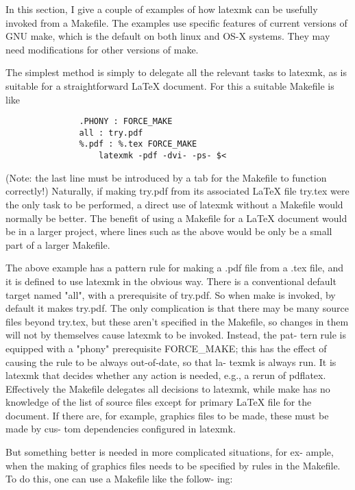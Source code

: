 In this section, I give a couple of examples of how latexmk can be usefully
invoked from a Makefile.  The examples use specific  features  of current
versions  of  GNU make, which is the default on both linux and OS-X systems.
They may need modifications for other versions of make.

The simplest method is simply to delegate all the relevant tasks to latexmk, as
is suitable for a straightforward LaTeX document.  For this a suitable Makefile
is like

\begin{verbatim}
	           .PHONY : FORCE_MAKE
	           all : try.pdf
	           %.pdf : %.tex FORCE_MAKE
	               latexmk -pdf -dvi- -ps- $<
\end{verbatim}

(Note: the last line must be introduced by a tab for  the  Makefile  to
function  correctly!)  Naturally, if making try.pdf from its associated
LaTeX file try.tex were the only task to be performed, a direct use  of
latexmk  without  a  Makefile would normally be better.  The benefit of
using a Makefile for a LaTeX document would be  in  a  larger  project,
where lines such as the above would be only be a small part of a larger
Makefile.

The above example has a pattern rule for making a .pdf file from a .tex
file,  and it is defined to use latexmk in the obvious way.  There is a
conventional  default  target  named  "all",  with  a  prerequisite  of
try.pdf.   So  when  make is invoked, by default it makes try.pdf.  The
only complication is  that  there  may  be  many  source  files  beyond
try.tex, but these aren't specified in the Makefile, so changes in them
will not by themselves cause latexmk to be invoked.  Instead, the  pat-
tern  rule is equipped with a "phony" prerequisite FORCE_MAKE; this has
the effect of causing the rule to be always out-of-date,  so  that  la-
texmk  is always run.  It is latexmk that decides whether any action is
needed, e.g., a rerun of pdflatex.  Effectively the Makefile  delegates
all  decisions  to  latexmk, while make has no knowledge of the list of
source files except for primary LaTeX file for the  document.  If there
are, for example, graphics files to be made, these must be made by cus-
tom dependencies configured in latexmk.

But something better is needed in more complicated situations, for  ex-
ample, when the making of graphics files needs to be specified by rules
in the Makefile.  To do this, one can use a Makefile like  the  follow-
ing:

